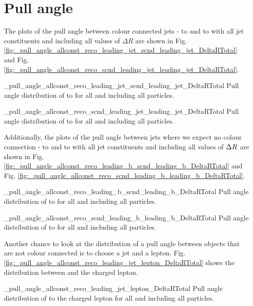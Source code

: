 \section{Pull angle}

The plots of the pull angle between colour connected jets - \leadingjet to \scndleadingjet and \scndleadingjet to \leadingjet with all jet constituents and including all values of $\Delta R$ are shown in Fig. \ref{fig:_pull_angle_allconst_reco_leading_jet_scnd_leading_jet_DeltaRTotal} and Fig. \ref{fig:_pull_angle_allconst_reco_scnd_leading_jet_leading_jet_DeltaRTotal}.

          {_pull_angle_allconst_reco_leading_jet_scnd_leading_jet_DeltaRTotal}
          {Pull angle distribution of \leadingjet to \scndleadingjet for all \DeltaR and including all particles.}

          {_pull_angle_allconst_reco_scnd_leading_jet_leading_jet_DeltaRTotal}
          {Pull angle distribution of \scndleadingjet to \leadingjet for all \DeltaR and including all particles.}

Additionally, the plots of the pull angle between jets where we expect no colour connection - \leadingb to \scndleadingb and \scndleadingb to \leadingb with all jet constituents and including all values of $\Delta R^{} $ are shown in Fig. \ref{fig:_pull_angle_allconst_reco_leading_b_scnd_leading_b_DeltaRTotal} and Fig. \ref{fig:_pull_angle_allconst_reco_scnd_leading_b_leading_b_DeltaRTotal}.

          {_pull_angle_allconst_reco_leading_b_scnd_leading_b_DeltaRTotal}
          {Pull angle distribution of \leadingb to \scndleadingb for all \DeltaR and including all particles.}

          {_pull_angle_allconst_reco_scnd_leading_b_leading_b_DeltaRTotal}
          {Pull angle distribution of \scndleadingb to \leadingb for all \DeltaR and including all particles.}


Another chance to look at the distribution of a pull angle between objects that are not colour connected is to choose a jet and a lepton. Fig. \ref{fig:_pull_angle_allconst_reco_leading_jet_lepton_DeltaRTotal} shows the distribution between \leadingjet and the charged lepton. 

          {_pull_angle_allconst_reco_leading_jet_lepton_DeltaRTotal}
          {Pull angle distribution of \leadingjet to the charged lepton for all \DeltaR and including all particles.}

